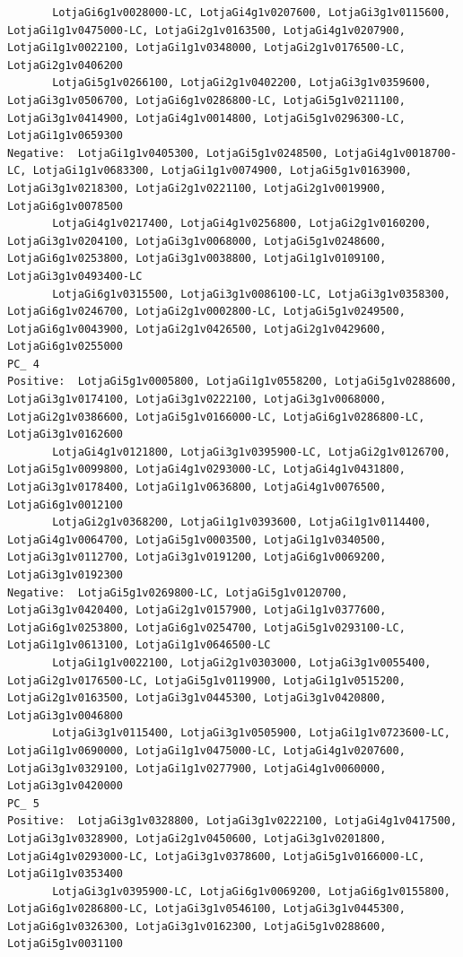 \documentclass[
  letterpaper,
  DIV=11,
  numbers=noendperiod]{scrartcl}
\begin{document}
\begin{verbatim}
       LotjaGi6g1v0028000-LC, LotjaGi4g1v0207600, LotjaGi3g1v0115600, LotjaGi1g1v0475000-LC, LotjaGi2g1v0163500, LotjaGi4g1v0207900, LotjaGi1g1v0022100, LotjaGi1g1v0348000, LotjaGi2g1v0176500-LC, LotjaGi2g1v0406200 
       LotjaGi5g1v0266100, LotjaGi2g1v0402200, LotjaGi3g1v0359600, LotjaGi3g1v0506700, LotjaGi6g1v0286800-LC, LotjaGi5g1v0211100, LotjaGi3g1v0414900, LotjaGi4g1v0014800, LotjaGi5g1v0296300-LC, LotjaGi1g1v0659300 
Negative:  LotjaGi1g1v0405300, LotjaGi5g1v0248500, LotjaGi4g1v0018700-LC, LotjaGi1g1v0683300, LotjaGi1g1v0074900, LotjaGi5g1v0163900, LotjaGi3g1v0218300, LotjaGi2g1v0221100, LotjaGi2g1v0019900, LotjaGi6g1v0078500 
       LotjaGi4g1v0217400, LotjaGi4g1v0256800, LotjaGi2g1v0160200, LotjaGi3g1v0204100, LotjaGi3g1v0068000, LotjaGi5g1v0248600, LotjaGi6g1v0253800, LotjaGi3g1v0038800, LotjaGi1g1v0109100, LotjaGi3g1v0493400-LC 
       LotjaGi6g1v0315500, LotjaGi3g1v0086100-LC, LotjaGi3g1v0358300, LotjaGi6g1v0246700, LotjaGi2g1v0002800-LC, LotjaGi5g1v0249500, LotjaGi6g1v0043900, LotjaGi2g1v0426500, LotjaGi2g1v0429600, LotjaGi6g1v0255000 
PC_ 4 
Positive:  LotjaGi5g1v0005800, LotjaGi1g1v0558200, LotjaGi5g1v0288600, LotjaGi3g1v0174100, LotjaGi3g1v0222100, LotjaGi3g1v0068000, LotjaGi2g1v0386600, LotjaGi5g1v0166000-LC, LotjaGi6g1v0286800-LC, LotjaGi3g1v0162600 
       LotjaGi4g1v0121800, LotjaGi3g1v0395900-LC, LotjaGi2g1v0126700, LotjaGi5g1v0099800, LotjaGi4g1v0293000-LC, LotjaGi4g1v0431800, LotjaGi3g1v0178400, LotjaGi1g1v0636800, LotjaGi4g1v0076500, LotjaGi6g1v0012100 
       LotjaGi2g1v0368200, LotjaGi1g1v0393600, LotjaGi1g1v0114400, LotjaGi4g1v0064700, LotjaGi5g1v0003500, LotjaGi1g1v0340500, LotjaGi3g1v0112700, LotjaGi3g1v0191200, LotjaGi6g1v0069200, LotjaGi3g1v0192300 
Negative:  LotjaGi5g1v0269800-LC, LotjaGi5g1v0120700, LotjaGi3g1v0420400, LotjaGi2g1v0157900, LotjaGi1g1v0377600, LotjaGi6g1v0253800, LotjaGi6g1v0254700, LotjaGi5g1v0293100-LC, LotjaGi1g1v0613100, LotjaGi1g1v0646500-LC 
       LotjaGi1g1v0022100, LotjaGi2g1v0303000, LotjaGi3g1v0055400, LotjaGi2g1v0176500-LC, LotjaGi5g1v0119900, LotjaGi1g1v0515200, LotjaGi2g1v0163500, LotjaGi3g1v0445300, LotjaGi3g1v0420800, LotjaGi3g1v0046800 
       LotjaGi3g1v0115400, LotjaGi3g1v0505900, LotjaGi1g1v0723600-LC, LotjaGi1g1v0690000, LotjaGi1g1v0475000-LC, LotjaGi4g1v0207600, LotjaGi3g1v0329100, LotjaGi1g1v0277900, LotjaGi4g1v0060000, LotjaGi3g1v0420000 
PC_ 5 
Positive:  LotjaGi3g1v0328800, LotjaGi3g1v0222100, LotjaGi4g1v0417500, LotjaGi3g1v0328900, LotjaGi2g1v0450600, LotjaGi3g1v0201800, LotjaGi4g1v0293000-LC, LotjaGi3g1v0378600, LotjaGi5g1v0166000-LC, LotjaGi1g1v0353400 
       LotjaGi3g1v0395900-LC, LotjaGi6g1v0069200, LotjaGi6g1v0155800, LotjaGi6g1v0286800-LC, LotjaGi3g1v0546100, LotjaGi3g1v0445300, LotjaGi6g1v0326300, LotjaGi3g1v0162300, LotjaGi5g1v0288600, LotjaGi5g1v0031100 

\end{verbatim}
\end{document}
